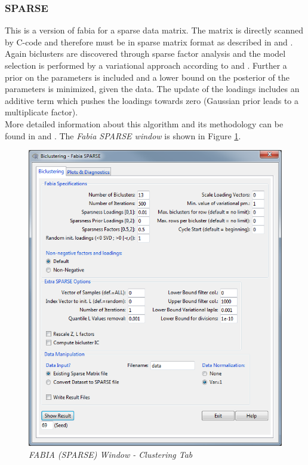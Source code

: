 \documentclass[a4paper]{article}\usepackage[]{graphicx}\usepackage[]{color}
\begin{document}
\subsubsection{SPARSE}
This is a version of fabia for a sparse data matrix. The matrix is directly
scanned by C-code and therefore must be in sparse matrix format as described in
\citet{Hochreiter2010} and \citet{Hochreiter2014a}. \\
Again biclusters are discovered through sparse factor analysis and the model
selection is performed by a variational approach according to
\citet{Girolami2001} and \citet{Palmer2006}. Further a prior on the parameters
is included and a lower bound on the posterior of the parameters is minimized, given the data. The
update of the loadings includes an additive term which pushes the loadings
towards zero (Gaussian prior leads to a multiplicate factor).\\
More detailed information about this algorithm and its methodology can be
found in \citet{Hochreiter2010} and \citet{Hochreiter2014a}. The {\it Fabia
SPARSE window} is shown in Figure \ref{fabia_sparse}.
\begin{figure}[H]
\centering
\includegraphics[scale=0.5]{figures/fabia_sparse.png}
\caption{{\it FABIA (SPARSE) Window - Clustering
Tab}\label{fabia_sparse}}
\end{figure}
\end{document}
